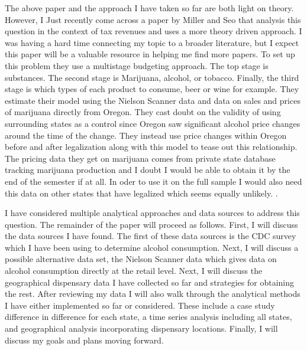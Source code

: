 \documentclass[11pt]{article}
\begin{document}
The above paper and the approach I have taken so far are both light on theory. However, I Just recently come across a paper by Miller and Seo that analysis this question in the context of tax revenues and uses a more theory driven approach. I was having a hard time connecting my topic to a broader literature, but I expect this paper will be a valuable resource in helping me find more papers. To set up this problem they use a multistage budgeting approach. The top stage is substances. The second stage is Marijuana, alcohol, or tobacco. Finally, the third stage is which types of each product to consume, beer or wine for example. They estimate their model using the Nielson Scanner data and data on sales and prices of marijuana directly from Oregon. They cast doubt on the validity of using surrounding states as a control since Oregon saw significant alcohol price changes around the time of the change. They instead use price changes within Oregon before and after legalization along with this model to tease out this relationship. The pricing data they get on marijuana comes from private state database tracking marijuana production and I doubt I would be able to obtain it by the end of the semester if at all. In oder to use it on the full sample I would also need this data on other states that have legalized which seems equally unlikely.   \cite{miller_seo_2018}.
\par


I have considered multiple analytical approaches and data sources to address this question. The remainder of the paper will proceed as follows. First, I will discuss the data sources I have found. The first of these data sources is the CDC survey which I have been using to determine alcohol consumption. Next, I will discuss a possible alternative data set, the Nielson Scanner data which gives data on alcohol consumption directly at the retail level. Next, I will discuss the geographical dispensary data I have collected so far and strategies for obtaining the rest. After reviewing my data I will also walk through the analytical methods I have either implemented so far or considered. These include a case study difference in difference for each state, a time series analysis including all states, and geographical analysis incorporating dispensary locations.   Finally, I will discuss my goals and plans moving forward.


\end{document}
